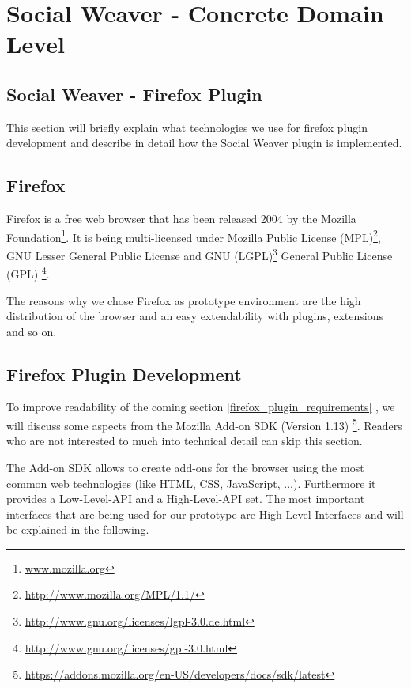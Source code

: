 \section{Social Weaver - Concrete Domain Level}\label{sowe-concrete}

\subsection{Social Weaver - Firefox Plugin} \label{sowe-firefox}
This section will briefly explain what technologies we use for firefox plugin development and describe in detail how the Social Weaver plugin is implemented.

\subsection{Firefox}
Firefox is a free web browser that has been released 2004 by the Mozilla Foundation\footnote{\url{www.mozilla.org}}. It is being multi-licensed under Mozilla Public License (MPL)\footnote{\url{http://www.mozilla.org/MPL/1.1/}}, GNU Lesser General Public License and GNU (LGPL)\footnote{\url{http://www.gnu.org/licenses/lgpl-3.0.de.html}} General Public License (GPL) \footnote{\url{http://www.gnu.org/licenses/gpl-3.0.html}}. 

The reasons why we chose Firefox as prototype environment are the high distribution of the browser and an easy extendability with plugins, extensions and so on.

\subsection{Firefox Plugin Development}
To improve readability of the coming section \ref{firefox_plugin_requirements} , we will discuss some aspects from the Mozilla Add-on SDK (Version 1.13) \footnote{\url{https://addons.mozilla.org/en-US/developers/docs/sdk/latest}}. Readers who are not interested to much into technical detail can skip this section.

The Add-on SDK allows to create add-ons for the browser using the most common web technologies (like HTML, CSS, JavaScript, ...). Furthermore it provides a Low-Level-API and a High-Level-API set. The most important interfaces that are being used for our prototype are High-Level-Interfaces and will be explained in the following.

